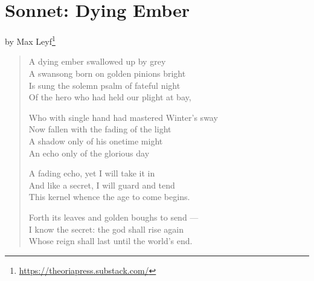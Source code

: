 \section{Sonnet: Dying Ember}

by Max Leyf\footnote{\url{https://theoriapress.substack.com/}}

\begin{verse}
A dying ember swallowed up by grey\\
A swansong born on golden pinions bright\\
Is sung the solemn psalm of fateful night\\
Of the hero who had held our plight at bay,

Who with single hand had mastered Winter’s sway\\
Now fallen with the fading of the light\\
A shadow only of his onetime might\\
An echo only of the glorious day

A fading echo, yet I will take it in\\
And like a secret, I will guard and tend\\
This kernel whence the age to come begins.

Forth its leaves and golden boughs to send —\\
I know the secret: the god shall rise again\\
Whose reign shall last until the world’s end.
\end{verse}


